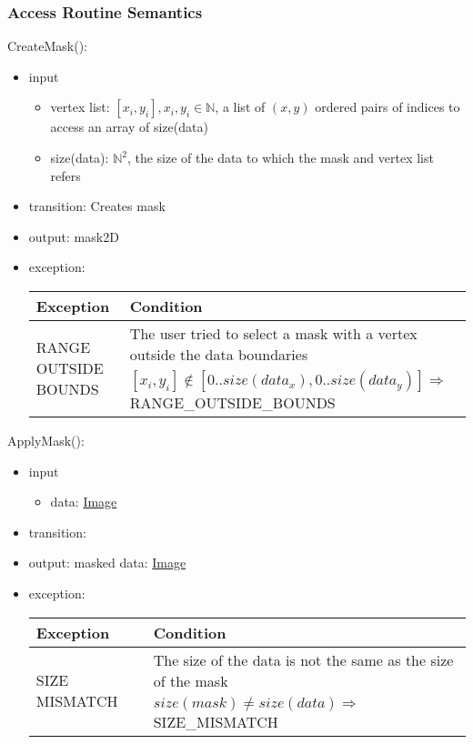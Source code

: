 \documentclass[12pt, titlepage]{article}
\begin{document}
\subsubsection{Access Routine Semantics}

\noindent CreateMask():
\begin{itemize}
    \item input
    \begin{itemize}
        \item vertex list: $[x_i, y_i], x_i, y_i \in \mathbb{N}$, a list of
        $(x,y)$ ordered pairs of indices to access an array of size(data)
        \item size(data): $\mathbb{N}^2$, the size of the data to which the mask
        and vertex list refers
    \end{itemize}
    \item transition: Creates mask
    \item output: mask2D
    \item exception:
    \begin{center}
        \begin{tabular}{p{3.5cm} p{12cm}}
            \toprule[0.15em]
            \textbf{Exception} & \textbf{Condition}\\
            \midrule[0.1em]
            \multirow{2}{0.25\textwidth}{RANGE OUTSIDE BOUNDS} & The user tried
            to select a mask with a vertex outside the data boundaries\\ 
            & $[x_i, y_i] \notin [0..size(data_x), 0..size(data_y)] \Rightarrow$
            RANGE\_OUTSIDE\_BOUNDS\\ 
            \bottomrule[0.15em]
        \end{tabular}
    \end{center}
\end{itemize}

\noindent ApplyMask():
\begin{itemize}
    \item input
    \begin{itemize}
        \item data: \hyperref[Mod:Image]{Image}
    \end{itemize}
    \item transition:
    \item output: masked data: \hyperref[Mod:Image]{Image}
    \item exception:
    \begin{center}
        \begin{tabular}{p{3.5cm} p{12cm}}
            \toprule[0.15em]
            \textbf{Exception} & \textbf{Condition}\\
            \midrule[0.1em]
            \multirow{2}{0.25\textwidth}{SIZE MISMATCH} & The size of the data
            is not the same as the size of the mask\\ 
            & $size(mask) \neq size(data) \Rightarrow$ SIZE\_MISMATCH\\ 
            \bottomrule[0.15em]
        \end{tabular}
    \end{center}
\end{itemize}
\end{document}
